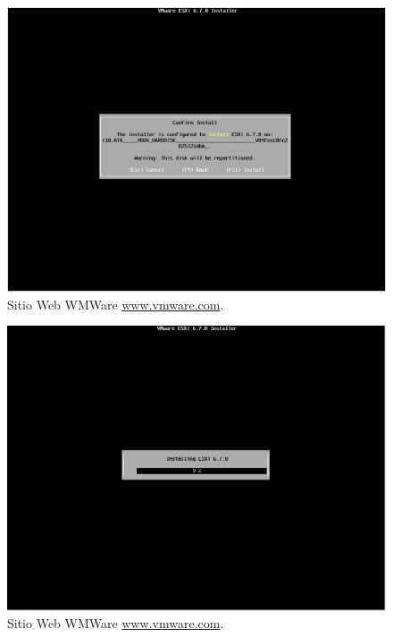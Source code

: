 \begin{figure}[!hbtp]
	\centering
	\includegraphics[width=\linewidth]{Trabajo/RecursosEducativos/RE01_VMwareESXi/RE_VMwareInstalacion11.png}
	\vspace{-0.2cm}
	\caption{Sitio Web WMWare \url{www.vmware.com}.\footnotemark[2]{} }
	\label{fig:VMwareInstalacion11}
\end{figure}


\begin{figure}[!hbtp]
	\centering
	\includegraphics[width=\linewidth]{Trabajo/RecursosEducativos/RE01_VMwareESXi/RE_VMwareInstalacion12.png}
	\vspace{-0.2cm}
	\caption{Sitio Web WMWare \url{www.vmware.com}.\footnotemark[2]{} }
	\label{fig:VMwareInstalacion12}
\end{figure}


